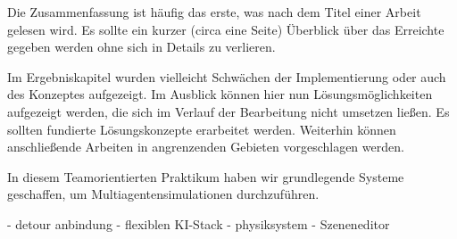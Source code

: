 
Die Zusammenfassung ist häufig das erste, was nach dem Titel einer Arbeit gelesen wird. Es sollte ein kurzer (circa eine Seite) Überblick über das Erreichte gegeben werden ohne sich in Details zu verlieren.

Im Ergebniskapitel wurden vielleicht Schwächen der Implementierung oder auch des Konzeptes aufgezeigt. Im Ausblick können hier nun Lösungsmöglichkeiten aufgezeigt werden, die sich im Verlauf der Bearbeitung nicht umsetzen ließen. Es sollten fundierte Lösungskonzepte erarbeitet werden. Weiterhin können anschließende Arbeiten in angrenzenden Gebieten vorgeschlagen werden.

In diesem Teamorientierten Praktikum haben wir grundlegende Systeme geschaffen, um Multiagentensimulationen durchzuführen. 

- detour anbindung
- flexiblen KI-Stack
- physiksystem
- Szeneneditor